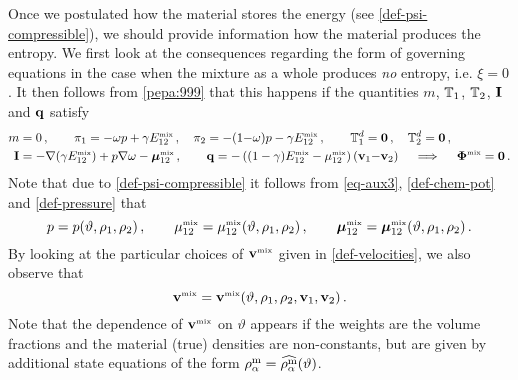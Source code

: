 \documentclass[a4paper]{article}
\begin{document}
Once we postulated how the material stores the energy (see \eqref{def-psi-compressible}), we should provide information how the material produces the entropy. We first look at the consequences regarding the form of governing equations in the case when the mixture as a whole produces \textit{no} entropy, i.e. $\xi = 0$. It then follows from \eqref{pepa:999} that this happens if the quantities $m$, $\mathbb{T}_1$, $\mathbb{T}_2$, ${\mathbf{I}}$ and ${\bf{q}}$
satisfy
\begin{equation}
    \begin{split}
    m&=0\,,\qquad \pi_1 = {-}\omega p + \gamma E_{12}^{\mbox{\tiny{mix}}}\,, \quad \pi_2 = - (1{-}\omega)p - \gamma E_{12}^{\mbox{\tiny{mix}}}\,, \qquad \mathbb{T}^d_1 = {\mathbf{0}}\,, \quad \mathbb{T}^d_2 = \mathbf{0}\,,\\ 
    {\mathbf{I}} &= - \nabla(\gamma E_{12}^{\mbox{\tiny{mix}}}) + p\nabla \omega - \boldsymbol{\mu}_{12}^{\mbox{\tiny{mix}}}\,, \qquad {\bf{q}} = - \left((1-\gamma)E_{12}^{\mbox{\tiny{mix}}} -\mu_{12}^{\mbox{\tiny{mix}}}\right)({\bf v}_1{-}{\bf v}_2)\quad\implies\quad \mbox{\boldmath $\Phi$} ^{\mbox{\tiny{mix}}} = \mathbf{0}\,.
    \end{split} \label{pepa:998}
\end{equation}
Note that due to \eqref{def-psi-compressible} it follows from \eqref{eq-aux3}, \eqref{def-chem-pot} and \eqref{def-pressure} that 
\begin{equation}
    p = p (\vartheta, \rho_1, \rho_2)\,, \qquad \mu_{12}^{\mbox{\tiny{mix}}} = \mu_{12}^{\mbox{\tiny{mix}}}(\vartheta, \rho_1, \rho_2)\,, \qquad \boldsymbol{\mu}_{12}^{\mbox{\tiny{mix}}} = \boldsymbol{\mu}_{12}^{\mbox{\tiny{mix}}}(\vartheta, \rho_1, \rho_2)\,.\label{pepa:997}
\end{equation}
By looking at the particular choices of ${\bf v}^{\mbox{\tiny{mix}}}$ given in \eqref{def-velocities}, we also observe that 
\begin{equation}
    {\bf v}^{\mbox{\tiny{mix}}}= {\bf v}^{\mbox{\tiny{mix}}}(\vartheta, \rho_1, \rho_2,{\bf v}_1,{\bf v}_2)\,.\label{pepa:996}
\end{equation}
Note that the dependence of ${\bf v}^{\mbox{\tiny{mix}}}$ on $\vartheta$ appears if the weights are the volume fractions and the material (true) densities are non-constants, but are given by additional state equations of the form $\rho^{\rm m}_\alpha = \widehat{\rho^{\rm m}_\alpha}(\vartheta)$.
\end{document}
